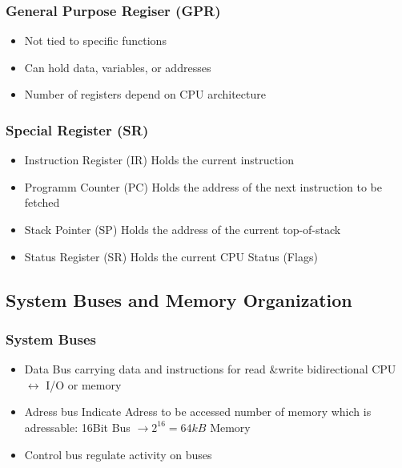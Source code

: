 \begin{multicols}{2}
	\subsubsection{General Purpose Regiser (GPR)}
	\begin{itemize}
		\item Not tied to specific functions
		\item Can hold data, variables, or addresses
		\item Number of registers depend on CPU architecture			
	\end{itemize}
	\subsubsection{Special Register (SR)}	
	\begin{itemize}
		\item Instruction Register (IR)
		\subitem Holds the current instruction 
		\item Programm Counter (PC)
		\subitem Holds the address of the next instruction to be fetched
		\item Stack Pointer (SP)
		\subitem Holds the address of the current top-of-stack 
		\item Status Register (SR)
		\subitem Holds the current CPU Status (Flags)
	\end{itemize}
\end{multicols}
\subsection{System Buses and Memory Organization}
\subsubsection{System Buses}
	\begin{itemize}
		\item Data Bus
		\subitem carrying data and instructions for read \&write
		\subitem bidirectional CPU $\leftrightarrow$ I/O or memory
		\item Adress bus
		\subitem Indicate Adress to be accessed
		\subitem number of memory which is adressable: 16Bit Bus $\rightarrow 2^{16}=64kB$ Memory
		\item Control bus
		\subitem regulate activity on buses		
	\end{itemize}

